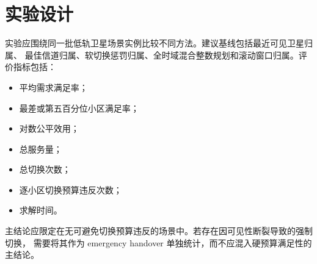
\section{实验设计}

实验应围绕同一批低轨卫星场景实例比较不同方法。建议基线包括最近可见卫星归属、
最佳信道归属、软切换惩罚归属、全时域混合整数规划和滚动窗口归属。评价指标包括：

\begin{itemize}
\item 平均需求满足率；
\item 最差或第五百分位小区满足率；
\item 对数公平效用；
\item 总服务量；
\item 总切换次数；
\item 逐小区切换预算违反次数；
\item 求解时间。
\end{itemize}

主结论应限定在无可避免切换预算违反的场景中。若存在因可见性断裂导致的强制切换，
需要将其作为 emergency handover 单独统计，而不应混入硬预算满足性的主结论。
